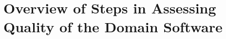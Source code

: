 \documentclass[letterpaper,cleveref]{lipics-v2019}
\theoremstyle{definition}
\begin{document}
%
%
%
%
%

\section{Overview of Steps in Assessing Quality of the Domain Software}\label{StepsAQDS}
\end{document}
